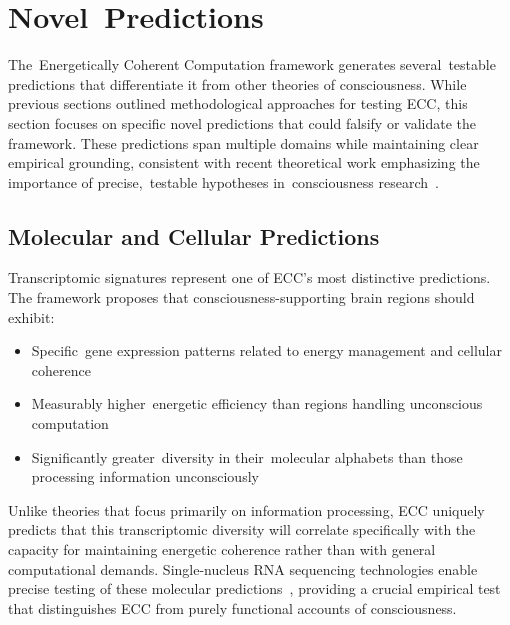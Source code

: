 \section{Novel~Predictions}

The~Energetically Coherent Computation framework generates several~testable predictions that differentiate it from other theories of consciousness. While previous sections outlined methodological approaches for testing ECC, this section focuses on specific novel predictions that could falsify or validate the framework. These predictions span multiple domains while maintaining clear empirical grounding, consistent with recent theoretical work emphasizing the importance of precise,~testable hypotheses in~consciousness research~\cite{Dehaene2014, Tononi2015}.

\subsection*{Molecular and Cellular Predictions}

Transcriptomic signatures represent one of ECC's most distinctive predictions. The framework proposes that consciousness-supporting brain regions should exhibit:

\begin{itemize}
    \item Specific~gene expression patterns related to energy management and cellular coherence~\cite{Zeng2017}
    
    \item Measurably higher~energetic efficiency than regions handling unconscious computation~\cite{Howarth2012, haier1988cortical}
    
    \item Significantly greater~diversity in their~molecular alphabets than those processing information unconsciously~\cite{Tasic2018, Gallegos2020}
\end{itemize}

Unlike theories that focus primarily on information processing, ECC uniquely predicts that this transcriptomic diversity will correlate specifically with the capacity for maintaining energetic coherence rather than with general computational demands. Single-nucleus RNA sequencing technologies enable precise testing of these molecular predictions~\cite{Lake2016, Girdhar2025}, providing a crucial empirical test that distinguishes ECC from purely functional accounts of consciousness.

